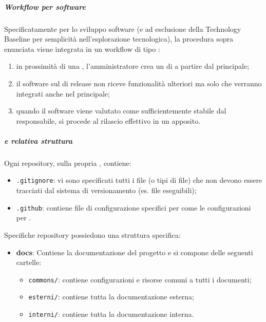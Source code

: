             \subparagraph{Workflow per software}
            Specificatamente per lo sviluppo software (e ad esclusione della Technology Baseline per semplicità nell'esplorazione tecnologica), la procedura sopra enunciata viene integrata in un workflow di tipo :
            \begin{enumerate}
                \item in prossimità di una , l'amministratore crea un  di  a partire dal  principale;
                \item il software sul  di release non riceve funzionalità ulteriori ma solo  che verranno integrati anche nel  principale;
                \item quando il software viene valutato come sufficientemente stabile dal responsabile, si procede al rilascio effettivo in un  apposito.
            \end{enumerate}

            \subparagraph{ e relativa struttura}
            Ogni repository, sulla propria , contiene:
            \begin{itemize}
                \item \verb!.gitignore!: vi sono specificati tutti i file (o tipi di file) che non devono essere tracciati dal sistema di versionamento (es. file eseguibili);
                \item \verb!.github!: contiene file di configurazione specifici per  come le configurazioni per .
            \end{itemize}
            Specifiche repository possiedono una struttura specifica:
            \begin{itemize}
                \item \textbf{docs}: Contiene la documentazione del progetto e si compone delle seguenti cartelle:
                \begin{itemize}
                    \item \verb!commons/!: contiene configurazioni e risorse comuni a tutti i documenti;
                    \item \verb!esterni/!: contiene tutta la documentazione esterna;
                    \item \verb!interni/!: contiene tutta la documentazione interna.
                \end{itemize}
            \end{itemize}

